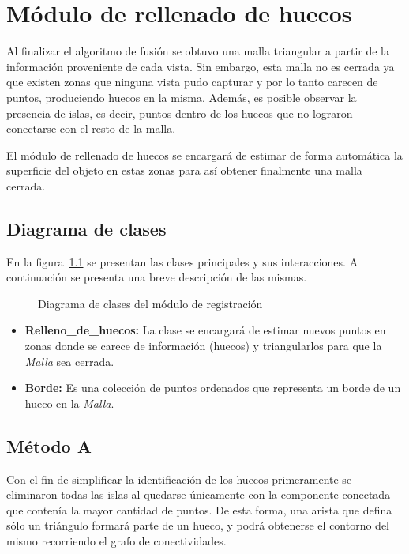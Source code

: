 \chapter{Módulo de rellenado de huecos}
	Al finalizar el algoritmo de fusión se obtuvo una malla triangular a partir
	de la información proveniente de cada vista.
	Sin embargo, esta malla no es cerrada ya que existen zonas que ninguna
	vista pudo capturar y por lo tanto carecen de puntos, produciendo huecos en la misma.
	Además, es posible observar la presencia de islas, es decir, puntos dentro de los huecos que no lograron conectarse con el resto de la malla.

	El módulo de rellenado de huecos se encargará de estimar de forma automática la superficie del
	objeto en estas zonas para así obtener finalmente una malla cerrada.

	\section{Diagrama de clases}
		En la figura~\ref{fig:filling_class} se presentan las clases principales y sus interacciones.
		A continuación se presenta una breve descripción de las mismas.
		\begin{figure}
			\caption{\label{fig:filling_class}Diagrama de clases del módulo de registración}
		\end{figure}

		\begin{itemize}
			\item {\bfseries Relleno\_de\_huecos:} La clase se encargará de estimar
				nuevos puntos en zonas donde se carece de información (huecos)
				y triangularlos para que la \emph{Malla} sea cerrada.
			\item {\bfseries Borde:} Es una colección de puntos ordenados
				que representa un borde de un hueco en la \emph{Malla}.
		\end{itemize}

	\section{Método A}
		Con el fin de simplificar la identificación de los huecos primeramente se eliminaron
		todas las islas al quedarse únicamente con la componente conectada que
		contenía la mayor cantidad de puntos.
		De esta forma, una arista que defina sólo un triángulo formará parte de un hueco,
		y podrá obtenerse el contorno del mismo recorriendo el grafo de conectividades. 

